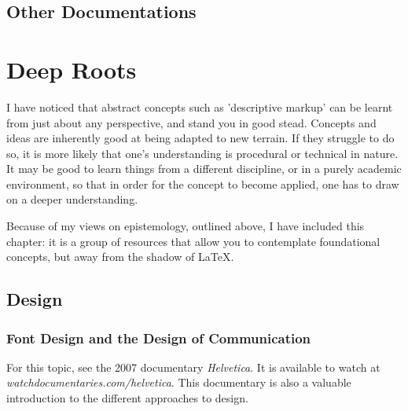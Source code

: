 \documentclass[11pt, oneside]{memoir}
\begin{document}
\section{Other Documentations}

\chapter{Deep Roots}

I have noticed that abstract concepts such as 'descriptive markup' can be learnt from just about any perspective, and stand you in good stead. Concepts and ideas are inherently good at being adapted to new terrain. If they struggle to do so, it is more likely that one's understanding is procedural or technical in nature. It may be good to learn things from a different discipline, or in a purely academic environment, so that in order for the concept to become applied, one has to draw on a deeper understanding.

Because of my views on epistemology, outlined above, I have included this chapter: it is a group of resources that allow you to contemplate foundational concepts, but away from the shadow of \LaTeX{}.

\section{Design}

\subsection*{Font Design and the Design of Communication}
For this topic, see the 2007 documentary \emph{Helvetica}. It is available to watch at \emph{watchdocumentaries.com/helvetica}. This documentary is also a valuable introduction to the different approaches to design. 
\end{document}
